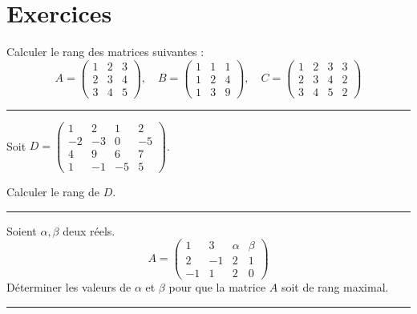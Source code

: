 \documentclass[../PolyS4.tex]{subfiles}
\begin{document}
\section{Exercices}


Calculer le rang des matrices suivantes :
$$A = \begin{pmatrix} 1 & 2 & 3 \\ 2 & 3 & 4 \\ 3 & 4 & 5 \end{pmatrix}, \quad
B = \begin{pmatrix} 1 & 1 & 1 \\ 1 & 2 & 4 \\ 1 & 3 & 9 \end{pmatrix}, \quad
C = \begin{pmatrix} 1 & 2 & 3 & 3 \\ 2 & 3 & 4 & 2 \\ 3 & 4 & 5 & 2 \end{pmatrix}$$

\vspace{1em}
\hrule
\vspace{1em}


Soit $D = \begin{pmatrix} 1 & 2 & 1 & 2 \\ -2 & -3 & 0 & -5 \\ 4 & 9 & 6 & 7 \\ 1 & -1 & -5 & 5 \end{pmatrix}$.

Calculer le rang de $D$.

\vspace{1em}
\hrule
\vspace{1em}


Soient $\alpha, \beta$ deux réels. 
$$A = \begin{pmatrix} 1 & 3 & \alpha & \beta \\ 2 & -1 & 2 & 1 \\ -1 & 1 & 2 & 0 \end{pmatrix}$$
Déterminer les valeurs de $\alpha$ et $\beta$ pour que la matrice $A$ soit de rang maximal.

\vspace{1em}
\hrule
\vspace{1em}
\end{document}

